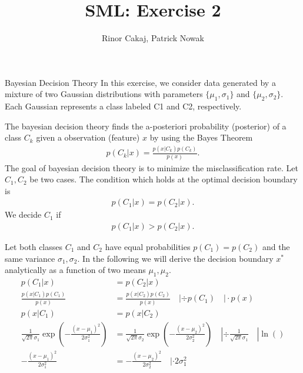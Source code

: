 \documentclass[
ngerman,
]{tudaexercise}
\begin{document}
	
	\title[Uebung]{SML: Exercise 2}
	\author{Rinor Cakaj, Patrick Nowak}
	
	\maketitle

	\begin{task}{Bayesian Decision Theory}
		In this exercise, we consider data generated by a mixture of two Gaussian distributions with parameters $\{\mu_1, \sigma_1\}$ and $\{\mu_2, \sigma_2\}$. Each Gaussian represents a class labeled C1 and C2, respectively.
		\begin{subtask}
			The bayesian decision theory finds the a-posteriori probability (posterior) of a class $C_k$ given a observation (feature) $x$ by using the Bayes Theorem
			\begin{align*}
			p(C_k | x) = \frac{p(x|C_k)p(C_k)}{p(x)}.
			\end{align*}
			The goal of bayesian decision theory is to minimize the misclassification rate. Let $C_1, C_2$ be two cases. The condition which holds at the optimal decision boundary is
			\begin{align*}
			p(C_1 | x ) = p (C_2 | x).
			\end{align*}
			We decide $C_1$ if 
			\begin{align*}
			p(C_1 | x) > p(C_2 | x).
			\end{align*}
		\end{subtask}
		\begin{subtask}
			Let both classes $C_1$ and $C_2$ have equal probabilities $p(C_1) = p(C_2)$ and the same variance $\sigma_1, \sigma_2$. In the following we will derive the decision boundary $x^*$ analytically as a function of two means $\mu_1, \mu_2$.
			\begin{align*}
			p(C_1 | x) &= p(C_2 | x) \\
			\frac{p(x | C_1) p(C_1)}{p(x)} &= \frac{p(x | C_2) p(C_2)}{p(x)} \quad | \div p(C_1) \quad | \cdot p(x) \\
			p(x | C_1) &= p(x |C_2) \\
			\frac{1}{\sqrt{2 \pi} \sigma_1} \exp \left( -\frac{(x- \mu_1)^2}{2 \sigma_1^2} \right) &= \frac{1}{\sqrt{2 \pi} \sigma_2} \exp \left( -\frac{(x- \mu_2)^2}{2 \sigma_2^2} \right) \quad | \div \frac{1}{\sqrt{2 \pi} \sigma_1} \quad | \ln() \\
			-\frac{(x- \mu_1)^2}{2 \sigma_1^2} &= -\frac{(x- \mu_2)^2}{2 \sigma_2^2} \quad | \cdot 2 \sigma_1^2 \\

\end{align*}
\end{subtask}
\end{task}
\end{document}
